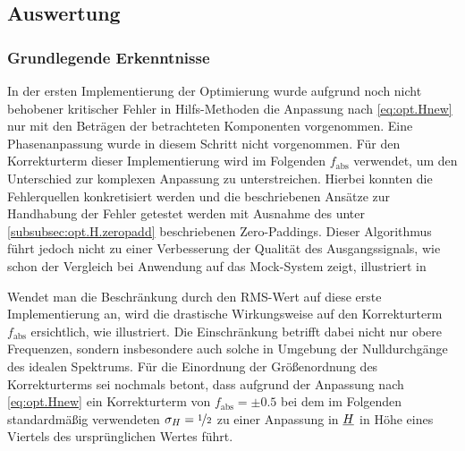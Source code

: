 \documentclass[../Report.tex]{subfiles}
\begin{document}
 

\subsection{Auswertung}
\label{subsec:opt.H.auswertung}

\subsubsection{Grundlegende Erkenntnisse}

In der ersten Implementierung der Optimierung wurde aufgrund noch nicht behobener kritischer Fehler in Hilfs-Methoden die Anpassung nach \eqref{eq:opt.Hnew} nur mit den Beträgen der betrachteten Komponenten vorgenommen. Eine Phasenanpassung wurde in diesem Schritt nicht vorgenommen. Für den Korrekturterm dieser Implementierung wird im Folgenden $f_{\mathrm{abs}}$ verwendet, um den Unterschied zur komplexen Anpassung zu unterstreichen.
Hierbei konnten die Fehlerquellen konkretisiert werden und die beschriebenen Ansätze zur Handhabung der Fehler getestet werden mit Ausnahme des unter \ref{subsubsec:opt.H.zeropadd} beschriebenen Zero-Paddings.
Dieser Algorithmus führt jedoch nicht zu einer Verbesserung der Qualität des Ausgangssignals, wie schon der Vergleich bei Anwendung auf das Mock-System zeigt, illustriert in 

Wendet man die Beschränkung durch den RMS-Wert auf diese erste Implementierung an, wird die drastische Wirkungsweise auf den Korrekturterm $f_{\mathrm{abs}}$ ersichtlich, wie  illustriert. Die Einschränkung betrifft dabei nicht nur obere Frequenzen, sondern insbesondere auch solche in Umgebung der Nulldurchgänge des idealen Spektrums.
Für die Einordnung der Größenordnung des Korrekturterms sei nochmals betont, dass aufgrund der Anpassung nach \eqref{eq:opt.Hnew} ein Korrekturterm von $f_{\mathrm{abs}} = \pm 0.5$ bei dem im Folgenden standardmäßig verwendeten $\sigma_H = \nicefrac{1}{2}$ zu einer Anpassung in $\underline{H}$ in Höhe eines Viertels des ursprünglichen Wertes führt.

 \fabsOrig 
{} \fabsRMSone 
\end{document}
